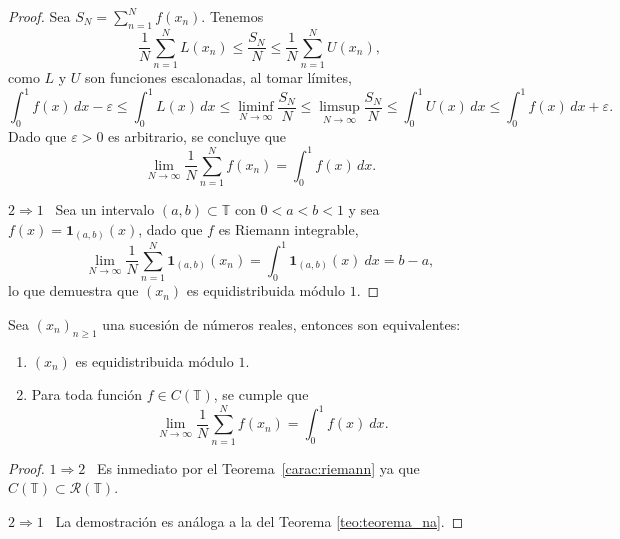 \begin{proof}
    Sea $S_N = \sum_{n=1}^N f(x_n)$. Tenemos
    \[
        \frac{1}{N} \sum_{n=1}^N L(x_n) \leq \frac{S_N}{N} \leq \frac{1}{N} \sum_{n=1}^N U(x_n),
    \]
    como $L$ y $U$ son funciones escalonadas, al tomar límites,
    \[
        \int_0^1 f(x) \, dx - \varepsilon 
        \leq \int_0^1 L(x) \, dx 
        \leq \liminf_{N \to \infty} \frac{S_N}{N} 
        \leq \limsup_{N \to \infty} \frac{S_N}{N} 
        \leq \int_0^1 U(x) \, dx 
        \leq \int_0^1 f(x) \, dx + \varepsilon.
    \]
    Dado que $\varepsilon > 0$ es arbitrario, se concluye que
    \[
        \lim_{N \to \infty} \frac{1}{N} \sum_{n=1}^N f(x_n) = \int_0^1 f(x) \, dx.
    \]

    $2 \Longrightarrow 1$ \, Sea un intervalo $(a,b) \subset \mathbb{T}$ con $0<a<b<1$ y sea $f(x) = \mathbf{1}_{(a,b)}(x)$, 
    dado que $f$ es Riemann integrable,
    \[
        \lim_{N \to \infty} \frac{1}{N} \sum_{n=1}^N \mathbf{1}_{(a,b)}(x_n) = \int_0^1 \mathbf{1}_{(a,b)}(x)\ dx = b-a,
    \]
    lo que demuestra que $(x_n)$ es equidistribuida módulo $1$.
\end{proof}

\begin{corollary}
    \label{carac:continua}
    Sea $(x_n)_{n\geq1}$ una sucesión de números reales, entonces son equivalentes:
    \begin{enumerate}
        \item $(x_n)$ es equidistribuida módulo $1$.
        \item Para toda función $f\in C(\mathbb{T})$, se cumple que
              \[
                  \lim_{N \to \infty} \frac{1}{N} \sum_{n=1}^N f(x_n) = \int_0^1 f(x)\ dx.
              \]
    \end{enumerate}
\end{corollary}

\begin{proof}
    $1 \Longrightarrow 2$ \, Es inmediato por el Teorema~\ref{carac:riemann} ya que $C(\mathbb{T}) \subset \mathcal{R}(\mathbb{T})$.

    $2 \Longrightarrow 1$ \, La demostración es análoga a la del Teorema \ref{teo:teorema_na}.
\end{proof}